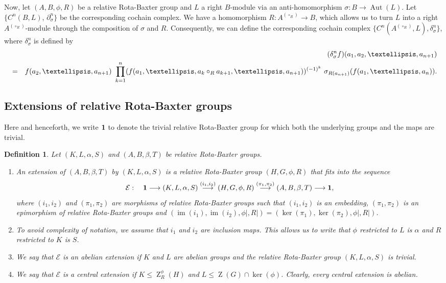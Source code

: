 \documentclass[11pt]{amsart}
\theoremstyle{thrm}
\theoremstyle{plain}
\newtheorem{defn}[thm]{Definition}
\theoremstyle{definition}
\newcommand{\Z}{\operatorname{Z} }
\newcommand{\Aut}{\operatorname{Aut} }
\newcommand{\Ker}{\operatorname{ker} }
\newcommand{\IM}{\operatorname{im} }
\numberwithin{equation}{section}
\begin{document}
Now, let $(A,B, \phi, R)$ be a relative Rota-Baxter group and $L$ a right $B$-module via an anti-homomorphism $\sigma: B \to \Aut(L)$. Let $\{C^n(B, L)$, $\partial^{n}_{\sigma}\}$ be the corresponding cochain complex. We have a homomorphism $R: A^{(\circ_R)} \rightarrow B$, which allows us to turn $L$  into a right $A^{(\circ_R)}$-module through the composition of $\sigma$ and $R$.  Consequently, we can define the corresponding cochain complex $\{C^n(A^{(\circ_R)}, L), \delta_{\sigma}^n\}$, where $\delta_{\sigma}^n$ is defined by 
\begin{eqnarray}\label{group coboundary twisted sigma}
&&	(\delta_{\sigma}^n f)(a_1, a_2,\ldots, a_{n+1})\\
 &= & f(a_2, \ldots,a_{n+1}) ~\prod^{n}_{k=1}    (f(a_1, \ldots, a_k \circ_R a_{k+1}, \ldots, a_{n+1}))^{(-1)^k} ~ \sigma_{R(a_{n+1})}(f(a_1, \ldots,a_{n})). \notag
\end{eqnarray}
\medskip

\subsection{Extensions of relative Rota-Baxter groups}\label{subsec extensions of RRB groups}
Here and henceforth, we write $\bf{1}$ to denote the trivial relative Rota-Baxter group for which both the underlying groups and the maps are trivial.

\begin{defn}
Let $(K,L, \alpha,S )$ and $(A,B, \beta, T)$ be relative Rota-Baxter groups.  
\begin{enumerate}
\item An extension of $(A,B, \beta, T)$ by $(K,L, \alpha,S )$ is a relative Rota-Baxter group  $(H,G, \phi, R)$ that fits into the sequence 
$$\mathcal{E} : \quad  {\bf 1} \longrightarrow (K,L, \alpha,S ) \stackrel{(i_1, i_2)}{\longrightarrow}  (H,G, \phi, R) \stackrel{(\pi_1, \pi_2)}{\longrightarrow} (A,B, \beta, T) \longrightarrow {\bf 1},$$ 
where  $(i_1, i_2)$ and $(\pi_1, \pi_2)$ are morphisms of relative Rota-Baxter groups such that $(i_1, i_2)$ is an embedding, $(\pi_1, \pi_2)$ is an epimorphism of  relative Rota-Baxter groups and $(\IM(i_1), \IM(i_2), \phi|, R|)= (\Ker(\pi_1), \Ker(\pi_2), \phi|, R|)$.
\item[] To avoid complexity of notation, we assume that $i_1$ and $i_2$ are inclusion maps. This allows us to write that $\phi$ restricted to  $L$ is $\alpha$ and $R$ restricted to  $K$ is $S$.	
		\item We say that $\mathcal{E}$ is an abelian extension if $K$ and $L$ are abelian groups and the relative Rota-Baxter group $(K,L, \alpha,S )$ is trivial.
		
		\item We say that $\mathcal{E}$ is a central extension if $K \leq \Z^{\phi}_{R}(H)$ and $L \leq \Z(G) \cap \Ker(\phi)$. Clearly, every central extension is abelian.
	\end{enumerate}
\end{defn}
\end{document}
